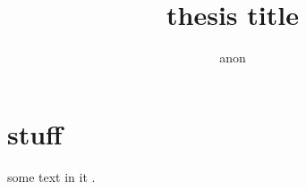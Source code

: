 \documentclass[11pt,Chicago]{uuthesis2e}
\title{thesis title}
\author{anon}
\begin{document}
\frontmatterformat
\titlepage
\copyrightpage
\committeeapproval
{}
\setcounter{tocdepth}{4}    %
\tableofcontents
\listoffigures
\listoftables
%
%
\maintext       %
%
%
%
%
%
%

\chapter{stuff}
some text in it
\citep{muller2013real}.

%
%
%
%

\def\newblock{\hskip .11em plus .33em minus .07em}



\end{document}
